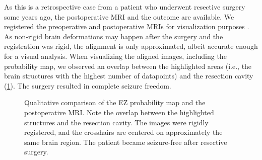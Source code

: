 As this is a retrospective case from a patient who underwent resective surgery some years ago, the postoperative \ac{MRI} and the outcome are available.
We registered the preoperative and postoperative \acp{MRI} for visualization purposes \cite{ourselin_block_2000}.
As non-rigid brain deformations may happen after the surgery and the registration was rigid, the alignment is only approximated, albeit accurate enough for a visual analysis.
When visualizing the aligned images, including the probability map, we observed an overlap between the highlighted areas (i.e., the brain structures with the highest number of datapoints) and the resection cavity (\cref{fig:svt_resection}).
The surgery resulted in complete seizure freedom.

\begin{figure}
  \centering
  \caption[Comparison of the probability map and the postoperative MRI]{
    Qualitative comparison of the \ac{EZ} probability map and the postoperative \ac{MRI}.
    Note the overlap between the highlighted structures and the resection cavity.
    The images were rigidly registered, and the crosshairs are centered on approximately the same brain region.
    The patient became seizure-free after resective surgery.
  }
  \label{fig:svt_resection}
\end{figure}
